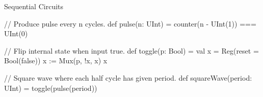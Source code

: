 \documentclass[xcolor=pdflatex,dvipsnames,table]{beamer}
\begin{document}
\begin{frame}[fragile]{Sequential Circuits}

\begin{scala}
// Produce pulse every n cycles.
def pulse(n: UInt) = counter(n - UInt(1)) === UInt(0)
\end{scala}

\begin{scala}
// Flip internal state when input true.
def toggle(p: Bool) = {
  val x = Reg(reset = Bool(false))
  x := Mux(p, !x, x)
  x
}
\end{scala}

\begin{scala}
// Square wave where each half cycle has given period.
def squareWave(period: UInt) = toggle(pulse(period))
\end{scala}

\end{frame}
\end{document}
